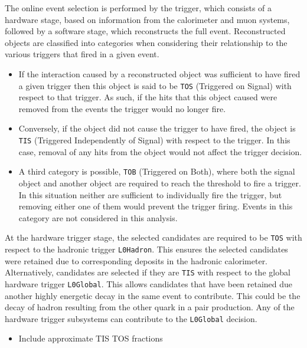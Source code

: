 The online event selection is performed by the \lhcb trigger, which consists of a hardware stage, based on information from the calorimeter and muon
systems, followed by a software stage, which reconstructs the full event.
Reconstructed objects are classified into categories when considering their relationship to the various triggers that fired in a given event. 
\begin{itemize}
\item If the interaction caused by a reconstructed object was sufficient to have fired a given trigger then this object is said to be \texttt{TOS} (Triggered on Signal) with respect to that trigger. As such, if the hits that this object caused were removed from the events the trigger would no longer fire. 
\item Conversely, if the object did not cause the trigger to have fired, the object is \texttt{TIS} (Triggered Independently of Signal) with respect to the trigger. In this case, removal of any hits from the object would not affect the trigger decision. 
\item A third category is possible, \texttt{TOB} (Triggered on Both), where both the signal object and another object are required to reach the threshold to fire a trigger. In this situation neither are sufficient to individually fire the trigger, but removing either one of them would prevent the trigger firing. Events in this category are not considered in this analysis.
\end{itemize}

At the hardware trigger stage, the selected candidates are required to be \texttt{TOS} with respect to the hadronic trigger \texttt{L0Hadron}. This ensures the selected candidates were retained due to corresponding deposits in the hadronic calorimeter. Alternatively, candidates are selected if they are \texttt{TIS} with respect to the global hardware trigger \texttt{L0Global}. This allows candidates that have been retained due another highly energetic decay in the same event to contribute. This could be the decay of hadron resulting from the other \bquark quark in a \bquark\bquarkbar pair production. Any of the hardware trigger subsystems can contribute to the \texttt{L0Global} decision.

\begin{itemize}
\item Include approximate TIS TOS fractions
\end{itemize}


